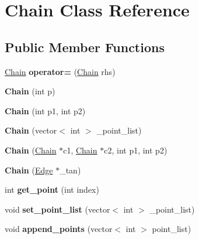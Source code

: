 \hypertarget{class_chain}{}\section{Chain Class Reference}
\label{class_chain}
\subsection*{Public Member Functions}
\begin{DoxyCompactItemize}
\item 
\mbox{\label{class_chain_a1c79a7f7fab0de5f913df25bb3fe97bc}} 
\mbox{\hyperlink{class_chain}{Chain}} {\bfseries operator=} (\mbox{\hyperlink{class_chain}{Chain}} rhs)
\item 
\mbox{\label{class_chain_a02adad32bc22245ee1698184424d001f}} 
{\bfseries Chain} (int p)
\item 
\mbox{\label{class_chain_a493567354bfbd6f6cb90585d496203dd}} 
{\bfseries Chain} (int p1, int p2)
\item 
\mbox{\label{class_chain_a213235ec23bce89ca05c3b877f34f7f4}} 
{\bfseries Chain} (vector$<$ int $>$ \+\_\+point\+\_\+list)
\item 
\mbox{\label{class_chain_a887ae7057902b6ee50a08a937983b352}} 
{\bfseries Chain} (\mbox{\hyperlink{class_chain}{Chain}} $\ast$c1, \mbox{\hyperlink{class_chain}{Chain}} $\ast$c2, int p1, int p2)
\item 
\mbox{\label{class_chain_a9f1ed260dc9de174ed0ffedc01c8486b}} 
{\bfseries Chain} (\mbox{\hyperlink{class_edge}{Edge}} $\ast$\+\_\+tan)
\item 
\mbox{\label{class_chain_a43480df2c90e723fd4e21a0402b4a8c0}} 
int {\bfseries get\+\_\+point} (int index)
\item 
\mbox{\label{class_chain_af616e82703c3e20f4af02c8b05ccc26a}} 
void {\bfseries set\+\_\+point\+\_\+list} (vector$<$ int $>$ \+\_\+point\+\_\+list)
\item 
\mbox{\label{class_chain_a09c7e217db43fc0a1f3b1e9749a7425c}} 
void {\bfseries append\+\_\+points} (vector$<$ int $>$ point\+\_\+list)

\end{DoxyCompactItemize}
